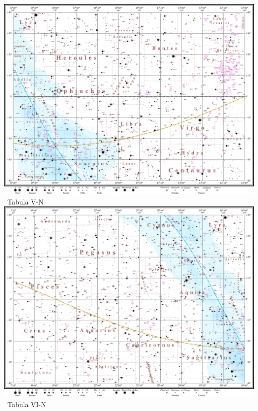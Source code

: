 \documentclass[10pt,landscape,oneside]{article}
\begin{document}
\begin{center}
\noindent\includegraphics[height=0.963\textheight]{TabulaV.pdf}\\[-0.985\textheight]\hfill\large~Tabula V-N\hspace{25mm}
\clearpage
%
\noindent\includegraphics[height=0.963\textheight]{TabulaVI.pdf}\\[-0.985\textheight]\hfill\large~Tabula VI-N\hspace{25mm}
\clearpage\clearpage
%

\end{center}
\end{document}
